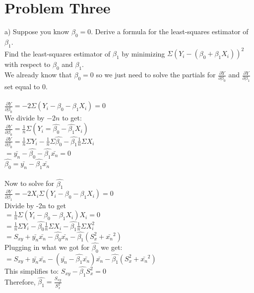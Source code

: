 \documentclass[11pt, oneside]{article}   	%
\begin{document}
\section{Problem Three}
a) Suppose you know $\beta_0 = 0$. Derive a formula for the least-squares estimator of $\beta_1$.\\
Find the least-squares estimator of $\beta_1$ by minimizing $\Sigma(Y_i - (\beta_0 + \beta_1 X_i))^2$ with respect to $\beta_0$ and $\beta_1$.\\
We already know that $\beta_0 = 0$ so we just need to solve the partials for $\frac{\partial Y}{\partial \beta_0}$ and $\frac{\partial Y}{\partial \beta_1}$ set equal to 0. \\~\\
$\frac{\partial Y}{\partial \beta_0} = -2\Sigma(Y_i - \beta_0 - \beta_1X_i) = 0$\\
We divide by $-2n$ to get:\\
$\frac{\partial Y}{\partial \beta_0} = \frac{1}{n}\Sigma(Y_i = \hat{\beta_0} - \hat{\beta_1}X_i)$\\
$\frac{\partial Y}{\partial \beta_0} = \frac{1}{n}\Sigma Y_i - \frac{1}{n}\Sigma \hat{\beta_0} - \hat{\beta_1}\frac{1}{n}\Sigma X_i$\\
$= \bar{y_n} - \hat{\beta_0} - \hat{\beta_1}\bar{x_n} = 0$\\
$\hat{\beta_0} = \bar{y_n} - \hat{\beta_1}\bar{x_n}$\\~\\
Now to solve for $\hat{\beta_1}$\\
$\frac{\partial Y}{\partial \beta_1} = -2X_i\Sigma(Y_i - \beta_0 - \beta_1X_i) = 0$\\
Divide by -2n to get\\
$= \frac{1}{n}\Sigma(Y_i - \beta_0 - \beta_1X_i)X_i = 0$\\
$=\frac{1}{n}\Sigma Y_i - \hat{\beta_0}\frac{1}{n}\Sigma X_i  - \hat{\beta_1} \frac{1}{n}\Sigma X_i^2$\\
$= S_{xy} + \bar{y_n}\bar{x_n} - \hat{\beta_0}\bar{x_n} - \hat{\beta_1}(S^2_x + \bar{x_n}^2)$\\
Plugging in what we got for $\hat{\beta_0}$ we get:\\
$= S_{xy} + \bar{y_n}\bar{x_n} - (\bar{y_n} - \hat{\beta_1}\bar{x_n})\bar{x_n} - \hat{\beta_1}(S^2_x + \bar{x_n}^2)$\\
This simplifies to: $S_{xy} - \hat{\beta_1}S^2_x = 0$\\
Therefore, $\hat{\beta_1} = \frac{S_{xy}}{S^2_x}$\\~\\
\end{document}
